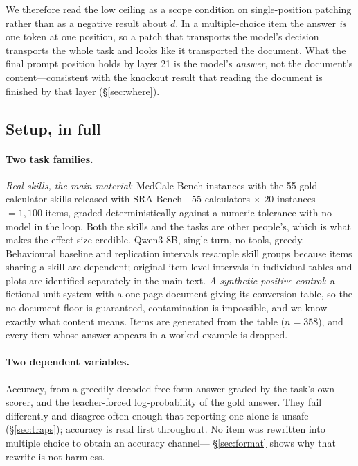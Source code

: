 \documentclass{article}
\newcommand{\dvec}{\ensuremath{d}}
\begin{document}
We therefore read the low ceiling as a scope condition on single-position
patching rather than as a negative result about $\dvec$. In a multiple-choice
item the answer \emph{is} one token at one position, so a patch that transports
the model's decision transports the whole task and looks like it transported the
document. What the final prompt position holds by layer 21 is the model's
\emph{answer}, not the document's content---consistent with the knockout result
that reading the document is finished by that layer (\S\ref{sec:where}).

\subsection{Setup, in full}
\label{app:setup}

\paragraph{Two task families.} \emph{Real skills, the main material}:
MedCalc-Bench instances with the 55 gold calculator skills released with
SRA-Bench---$55$ calculators $\times$ $20$ instances $= 1{,}100$ items, graded
deterministically against a numeric tolerance with no model in the loop. Both
the skills and the tasks are other people's, which is what makes the effect size
credible. Qwen3-8B, single turn, no tools, greedy. Behavioural baseline and replication
intervals resample skill groups because items sharing a skill are dependent;
original item-level intervals in individual tables and plots are identified
separately in the main text.
\emph{A synthetic positive control}: a fictional unit system with a one-page
document giving its conversion table, so the no-document floor is guaranteed,
contamination is impossible, and we know exactly what content means. Items are
generated from the table ($n=358$), and every item whose answer appears in a
worked example is dropped.

\paragraph{Two dependent variables.} Accuracy, from a greedily decoded free-form
answer graded by the task's own scorer, and the teacher-forced log-probability of
the gold answer. They fail differently and disagree often enough that reporting
one alone is unsafe (\S\ref{sec:traps}); accuracy is read first throughout. No
item was rewritten into multiple choice to obtain an accuracy channel---%
\S\ref{sec:format} shows why that rewrite is not harmless.
\end{document}
